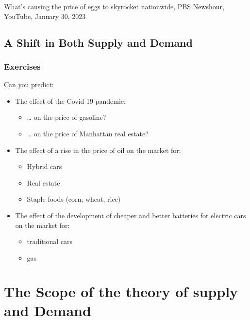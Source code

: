 \documentclass[
  letterpaper,
]{book}
\providecommand{\tightlist}{%
  \setlength{\itemsep}{0pt}\setlength{\parskip}{0pt}}\usepackage{longtable,booktabs,array}
\begin{document}
\href{https://youtu.be/WAwEXycDhzY}{What's causing the price of eggs to
skyrocket nationwide}, PBS Newshour, YouTube, January 30, 2023

\subsection{A Shift in Both Supply and
Demand}\label{a-shift-in-both-supply-and-demand}

\subsubsection{Exercises}\label{exercises}

Can you predict:

\begin{itemize}
\tightlist
\item
  The effect of the Covid-19 pandemic:

  \begin{itemize}
  \tightlist
  \item
    \ldots{} on the price of gasoline?
  \item
    \ldots{} on the price of Manhattan real estate?
  \end{itemize}
\item
  The effect of a rise in the price of oil on the market for:

  \begin{itemize}
  \tightlist
  \item
    Hybrid cars
  \item
    Real estate
  \item
    Staple foods (corn, wheat, rice)
  \end{itemize}
\item
  The effect of the development of cheaper and better batteries for
  electric cars on the market for:

  \begin{itemize}
  \tightlist
  \item
    traditional cars
  \item
    gas
  \end{itemize}
\end{itemize}

\section{The Scope of the theory of supply and
Demand}\label{the-scope-of-the-theory-of-supply-and-demand}
\end{document}
